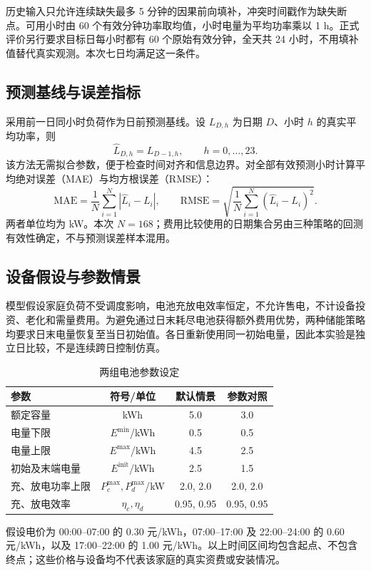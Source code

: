 \documentclass[fontset=windows,12pt,a4paper]{ctexart}
\begin{document}
历史输入只允许连续缺失最多 5 分钟的因果前向填补，冲突时间戳作为缺失断点。可用小时由 60 个有效分钟功率取均值，小时电量为平均功率乘以 1 h。正式评价另行要求目标日每小时都有 60 个原始有效分钟，全天共 24 小时，不用填补值替代真实观测。本次七日均满足这一条件。

\subsection{预测基线与误差指标}
采用前一日同小时负荷作为日前预测基线。设 $L_{D,h}$ 为日期 $D$、小时 $h$ 的真实平均功率，则
\begin{equation}
\widehat L_{D,h}=L_{D-1,h},\qquad h=0,\ldots,23.
\label{eq:forecast}
\end{equation}
该方法无需拟合参数，便于检查时间对齐和信息边界。对全部有效预测小时计算平均绝对误差（MAE）与均方根误差（RMSE）：
\begin{equation}
\mathrm{MAE}=\frac{1}{N}\sum_{i=1}^{N}|\widehat L_i-L_i|,
\qquad
\mathrm{RMSE}=\sqrt{\frac{1}{N}\sum_{i=1}^{N}(\widehat L_i-L_i)^2}.
\label{eq:errors}
\end{equation}
两者单位均为 kW。本次 $N=168$；费用比较使用的日期集合另由三种策略的回测有效性确定，不与预测误差样本混用。

\subsection{设备假设与参数情景}
模型假设家庭负荷不受调度影响，电池充放电效率恒定，不允许售电，不计设备投资、老化和需量费用。为避免通过日末耗尽电池获得额外费用优势，两种储能策略均要求日末电量恢复至当日初始值。各日重新使用同一初始电量，因此本实验是独立日比较，不是连续跨日控制仿真。

\begin{table}[H]
\centering\small
\caption{两组电池参数设定}
\label{tab:parameters}
\begin{tabular}{lccc}
\toprule
参数 & 符号/单位 & 默认情景 & 参数对照\\
\midrule
额定容量 & kWh & 5.0 & 3.0\\
电量下限 & $E^{\min}$/kWh & 0.5 & 0.5\\
电量上限 & $E^{\max}$/kWh & 4.5 & 2.5\\
初始及末端电量 & $E^{\mathrm{init}}$/kWh & 2.5 & 1.5\\
充、放电功率上限 & $P_c^{\max},P_d^{\max}$/kW & 2.0, 2.0 & 2.0, 2.0\\
充、放电效率 & $\eta_c,\eta_d$ & 0.95, 0.95 & 0.95, 0.95\\
\bottomrule
\end{tabular}
\end{table}
假设电价为 00:00--07:00 的 0.30 元/kWh，07:00--17:00 及 22:00--24:00 的 0.60 元/kWh，以及 17:00--22:00 的 1.00 元/kWh。以上时间区间均包含起点、不包含终点；这些价格与设备均不代表该家庭的真实资费或安装情况。
\end{document}
